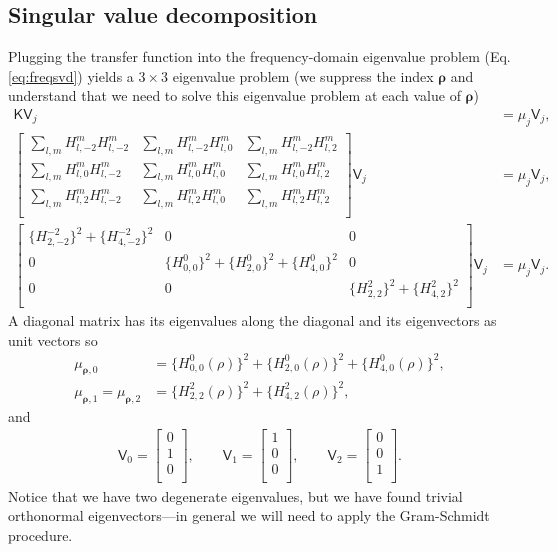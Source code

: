 \documentclass[11pt]{article}
\providecommand{\bs}[1]{\boldsymbol{#1}}
\begin{document}
\subsection{Singular value decomposition}
Plugging the transfer function into the frequency-domain eigenvalue problem (Eq.
\ref{eq:freqsvd}) yields a $3\times 3$ eigenvalue problem (we suppress the index
$\bs{\rho}$ and understand that we need to solve this eigenvalue problem at each
value of $\bs{\rho}$)
\begin{align}
  \mathsf{K}\mathsf{V}_j &= \mu_{j}\mathsf{V}_j,\\
  \begin{bmatrix}
    \sum_{l,m}H_{l,-2}^{m}H_{l,-2}^{m}&\sum_{l,m}H_{l,-2}^{m}H_{l,0}^{m}&\sum_{l,m}H_{l,-2}^{m}H_{l,2}^{m}\\
    \sum_{l,m}H_{l,0}^{m}H_{l,-2}^{m}&\sum_{l,m}H_{l,0}^{m}H_{l,0}^{m}&\sum_{l,m}H_{l,0}^{m}H_{l,2}^{m}\\
    \sum_{l,m}H_{l,2}^{m}H_{l,-2}^{m}&\sum_{l,m}H_{l,2}^{m}H_{l,0}^{m}&\sum_{l,m}H_{l,2}^{m}H_{l,2}^{m}\\    
  \end{bmatrix}\mathsf{V}_j
&= \mu_{j}\mathsf{V}_j,\\
  \begin{bmatrix}
    \{H_{2,-2}^{-2}\}^2 + \{H_{4,-2}^{-2}\}^2&0&0\\
    0&\{H_{0,0}^{0}\}^2 + \{H_{2,0}^{0}\}^2 + \{H_{4,0}^{0}\}^2&0\\
    0&0&\{H_{2,2}^{2}\}^2 + \{H_{4,2}^{2}\}^2\\    
  \end{bmatrix}\mathsf{V}_j
&= \mu_{j}\mathsf{V}_j.
\end{align}
A diagonal matrix has its eigenvalues along the diagonal and its eigenvectors as
unit vectors so
\begin{align}
  \mu_{\bs{\rho},0} &= \{H_{0,0}^{0}(\rho)\}^2 + \{H_{2,0}^{0}(\rho)\}^2 + \{H_{4,0}^{0}(\rho)\}^2,\\
  \mu_{\bs{\rho},1} = \mu_{\bs{\rho},2} &= \{H_{2,2}^{2}(\rho)\}^2 + \{H_{4,2}^{2}(\rho)\}^2,
\end{align}
and
\begin{align}
  \mathsf{V}_0 =
  \begin{bmatrix}
    0\\1\\0\\
  \end{bmatrix},\qquad
  \mathsf{V}_1 =
  \begin{bmatrix}
    1\\0\\0\\
  \end{bmatrix},\qquad
  \mathsf{V}_2 =
  \begin{bmatrix}
    0\\0\\1\\
  \end{bmatrix}.
\end{align}
Notice that we have two degenerate eigenvalues, but we have found trivial
orthonormal eigenvectors---in general we will need to apply the Gram-Schmidt
procedure.
\end{document}
